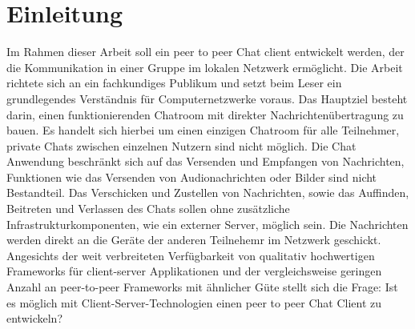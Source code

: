 \section{Einleitung}
Im Rahmen dieser Arbeit soll ein peer to peer Chat client entwickelt werden, der die Kommunikation in einer Gruppe im lokalen Netzwerk ermöglicht. 
Die Arbeit richtete sich an ein fachkundiges Publikum und setzt beim Leser ein grundlegendes Verständnis für Computernetzwerke voraus. 
Das Hauptziel besteht darin, einen funktionierenden Chatroom mit direkter Nachrichtenübertragung zu bauen.
Es handelt sich hierbei um einen einzigen Chatroom für alle Teilnehmer, private Chats zwischen einzelnen Nutzern sind nicht möglich. 
Die Chat Anwendung beschränkt sich auf das Versenden und Empfangen von Nachrichten, Funktionen wie das Versenden von Audionachrichten oder Bilder sind nicht Bestandteil. 
Das Verschicken und Zustellen von Nachrichten, sowie das Auffinden, Beitreten und Verlassen des Chats sollen ohne zusätzliche Infrastrukturkomponenten, wie ein externer Server, möglich sein.
Die Nachrichten werden direkt an die Geräte der anderen Teilnehemr im Netzwerk geschickt. 
Angesichts der weit verbreiteten Verfügbarkeit von qualitativ hochwertigen Frameworks für client-server Applikationen und der vergleichsweise geringen Anzahl an peer-to-peer Frameworks mit ähnlicher Güte stellt sich die Frage: 
Ist es möglich mit Client-Server-Technologien einen peer to peer Chat Client zu entwickeln?